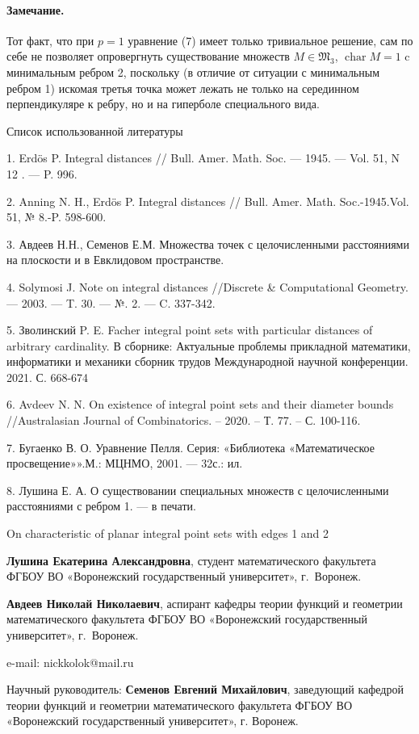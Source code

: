 \documentclass[a4paper,openbib]{article}
\begin{document}
\paragraph{Замечание.}
Тот факт, что при $p=1$ уравнение (7) имеет только тривиальное решение,
сам по себе не позволяет опровергнуть существование множеств
$M\in\mathfrak{M}_3$, $\operatorname{char}M=1$ c минимальным ребром 2,
поскольку (в отличие от ситуации с минимальным ребром 1)
искомая третья точка может лежать не только на серединном перпендикуляре к ребру,
но и на гиперболе специального вида.

Список использованной литературы

1. Erdös P. Integral distances // Bull. Amer. Math. Soc. --- 1945. --- Vol. 51, N 12 . ---
P. 996.

2. Anning N. H., Erdös P. Integral distances // Bull. Amer. Math. Soc.-1945.Vol. 51, № 8.-P. 598-600.

3. Авдеев Н.Н., Семенов Е.М. Множества точек с целочисленными расстояниями на плоскости и в Евклидовом пространстве.

4. Solymosi J. Note on integral distances //Discrete \& Computational Geometry. --- 2003. --- T. 30. --- №. 2. --- C. 337-342.

5. Зволинский P. E. Facher integral point sets with particular distances of arbitrary cardinality.
В сборнике: Актуальные проблемы прикладной математики, информатики и механики сборник трудов Международной научной конференции. 2021. С. 668-674

6. Avdeev N. N. On existence of integral point sets and their diameter bounds //Australasian Journal of Combinatorics. – 2020. – Т. 77. – С. 100-116.

7. Бугаенко В. О. Уравнение Пелля. Серия: «Библиотека «Математическое просвещение»».М.: МЦНМО, 2001. --- 32с.: ил.

8. Лушина Е. А. О существовании специальных множеств с целочисленными расстояниями с ребром 1. --- в печати.

On characteristic of planar integral point sets with edges 1 and 2

{\bf Лушина Екатерина Александровна}, студент математического факультета ФГБОУ ВО «Воронежский государственный университет», г.~Воронеж.

{\bf Авдеев Николай Николаевич}, аспирант кафедры теории функций и геометрии математического факультета ФГБОУ ВО «Воронежский государственный университет», г.~Воронеж.

e-mail: nickkolok@mail.ru

Научный руководитель:
{\bf Семенов Евгений Михайлович},
заведующий кафедрой теории функций и геометрии математического факультета ФГБОУ ВО «Воронежский государственный
университет», г. Воронеж.
\end{document}
